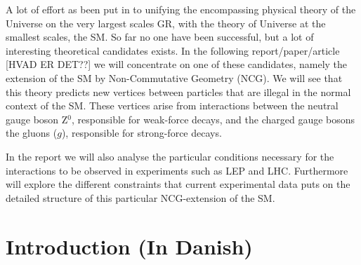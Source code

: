 A lot of effort as been put in to unifying the encompassing physical theory of the Universe on the very largest scales GR, with the theory of Universe at the smallest scales, the SM. So far no one have been successful, but a lot of interesting theoretical candidates exists. In the following report/paper/article [HVAD ER DET??] we will concentrate on one of these candidates, namely the extension of the SM by Non-Commutative Geometry (NCG). We will see that this theory predicts new vertices between particles that are illegal in the normal context of the SM. These vertices arise from interactions between the neutral gauge boson Z$^0$, responsible for weak-force decays, and the charged gauge bosons the gluons ($g$), responsible for strong-force decays.

In the report we will also analyse the particular conditions necessary for the interactions to be observed in experiments such as LEP and LHC. Furthermore will explore the different constraints that current experimental data puts on the detailed structure of this particular NCG-extension of the SM.

\section{Introduction (In Danish)}